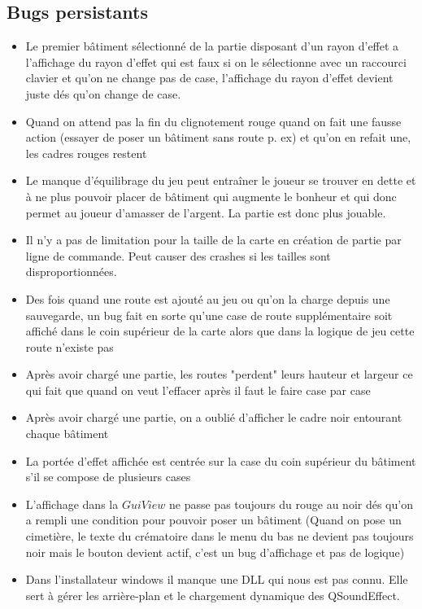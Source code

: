\documentclass[a4paper,10pt,openany,oneside]{report}
\begin{document}
\subsection{Bugs persistants}
\begin{itemize}
\item Le premier bâtiment sélectionné de la partie disposant d'un rayon d'effet a l'affichage du rayon d'effet qui est faux si on le sélectionne avec un raccourci clavier et qu'on ne change pas de case, l'affichage du rayon d'effet devient juste dés qu'on change de case.
\item Quand on attend pas la fin du clignotement rouge quand on fait une fausse action (essayer de poser un bâtiment sans route p. ex) et qu'on en refait une, les cadres rouges restent
\item Le manque d'équilibrage du jeu peut entraîner le joueur se trouver en dette et à ne plus pouvoir placer de bâtiment qui augmente le bonheur et qui donc permet au joueur d'amasser de l'argent. La partie est donc plus jouable.
\item Il n'y a pas de limitation pour la taille de la carte en création de partie par ligne de commande. Peut causer des crashes si les tailles sont disproportionnées.
\item Des fois quand une route est ajouté au jeu ou qu'on la charge depuis une sauvegarde, un bug fait en sorte qu'une case de route supplémentaire soit affiché dans le coin supérieur de la carte alors que dans la logique de jeu cette route n'existe pas
\item Après avoir chargé une partie, les routes "perdent" leurs hauteur et largeur ce qui fait que quand on veut l'effacer après il faut le faire case par case
\item Après avoir chargé une partie, on a oublié d'afficher le cadre noir entourant chaque bâtiment
\item La portée d'effet affichée est centrée sur la case du coin supérieur du bâtiment s'il se compose de plusieurs cases
\item L'affichage dans la $GuiView$ ne passe pas toujours du rouge au noir dés qu'on a rempli une condition pour pouvoir poser un bâtiment (Quand on pose un cimetière, le texte du crématoire dans le menu du bas ne devient pas toujours noir mais le bouton devient actif, c'est un bug d'affichage et pas de logique)
\item Dans l'installateur windows il manque une DLL qui nous est pas connu. Elle sert à gérer les arrière-plan et le chargement dynamique des QSoundEffect.
\end{itemize}
\end{document}
